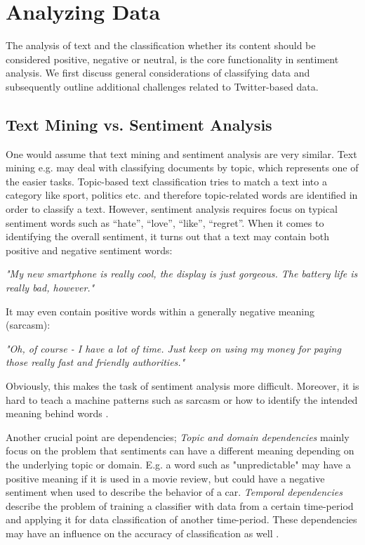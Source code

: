 \documentclass{acm_proc_article-sp}
\begin{document}
\section{Analyzing Data} \label{analyzingdata}

The analysis of text
and the classification whether its content should be considered positive, negative
or neutral, is the core functionality in sentiment analysis. We
first discuss general considerations of classifying data and subsequently
outline additional challenges related to Twitter-based data.

\subsection{Text Mining vs. Sentiment Analysis}

One would assume that text
mining and sentiment analysis are very similar. Text mining e.g. may deal with
classifying documents by topic, which represents one of the easier tasks.
Topic-based text classification tries to match a text into a category like
sport, politics etc. and therefore topic-related words are identified in order to
classify a text. However, sentiment analysis requires focus on typical
sentiment words such as ``hate'', ``love'', ``like'', ``regret''.  When it comes to
identifying the overall sentiment, it turns out that a text may contain
both positive and negative sentiment words:

\textit{"My new smartphone is really cool, the display is just gorgeous. The
battery life is really bad, however."}

It may even contain positive words within
a generally negative meaning (sarcasm):

\textsl{"Oh, of course - I have a lot of time. Just keep on using my money for
paying those really fast and friendly authorities."}

Obviously, this makes the task of sentiment analysis more difficult.
Moreover, it is hard to
teach a machine patterns such as sarcasm or how to identify the intended meaning
behind words \cite{liu2010sentimentanalysis,pang2008opinion}.


Another crucial point are dependencies; \emph{Topic and domain dependencies}
mainly focus on the problem that sentiments can
have a different meaning depending on the underlying topic or domain.
E.g. a
word such as "unpredictable" may have a positive meaning if it is used in a movie
review, but could have a negative sentiment when used to describe the behavior
of a car. \emph{Temporal dependencies} describe the problem of training a classifier
with data from a certain time-period and applying it for data classification
of another time-period.  These dependencies may have an influence on the
accuracy of classification as well \cite{read2005using,pang2008opinion}.
\end{document}
